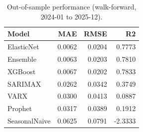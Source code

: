 \begin{table}
\caption{Out-of-sample performance (walk-forward, 2024-01 to 2025-12).}
\label{tab:model_metrics}
\begin{tabular}{lrrr}
\toprule
Model & MAE & RMSE & R2 \\
\midrule
ElasticNet & 0.0062 & 0.0204 & 0.7773 \\
Ensemble & 0.0063 & 0.0203 & 0.7810 \\
XGBoost & 0.0067 & 0.0202 & 0.7833 \\
SARIMAX & 0.0262 & 0.0342 & 0.3749 \\
VARX & 0.0300 & 0.0413 & 0.0887 \\
Prophet & 0.0317 & 0.0389 & 0.1912 \\
SeasonalNaive & 0.0625 & 0.0791 & -2.3333 \\
\bottomrule
\end{tabular}
\end{table}
